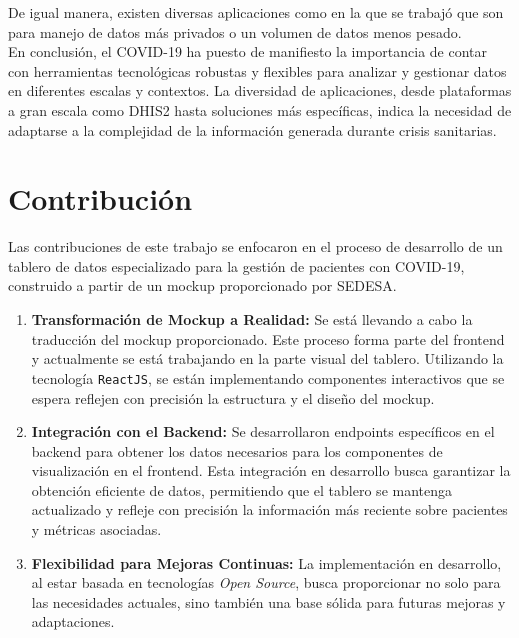 De igual manera, existen diversas aplicaciones como en la que se trabajó que son para manejo de datos más privados o un volumen de datos menos pesado.\\

En conclusión, el \textsc{COVID-19} ha puesto de manifiesto la importancia de contar con herramientas tecnológicas robustas y flexibles para analizar y gestionar datos en diferentes escalas y contextos. La diversidad de aplicaciones, desde plataformas a gran escala como \textsc{DHIS2} hasta soluciones más específicas, indica la necesidad de adaptarse a la complejidad de la información generada durante crisis sanitarias.



\section{Contribución}\label{intro_cont}


Las contribuciones de este trabajo se enfocaron en el proceso de desarrollo de un tablero de datos especializado para la gestión de pacientes con \textsc{COVID-19}, construido a partir de un mockup proporcionado por \textsc{SEDESA}. 

\begin{enumerate}
    \item \textbf{Transformación de Mockup a Realidad:} Se está llevando a cabo la traducción del mockup proporcionado. Este proceso forma parte del frontend y actualmente se está trabajando en la parte visual del tablero. Utilizando la tecnología \texttt{ReactJS}, se están implementando componentes interactivos que se espera reflejen con precisión la estructura y el diseño del mockup.

    
    \item \textbf{Integración con el Backend:} Se desarrollaron endpoints específicos en el backend para obtener los datos necesarios para los componentes de visualización en el frontend. Esta integración en desarrollo busca garantizar la obtención eficiente de datos, permitiendo que el tablero se mantenga actualizado y refleje con precisión la información más reciente sobre pacientes y métricas asociadas.
    
    \item \textbf{Flexibilidad para Mejoras Continuas:} La implementación en desarrollo, al estar basada en tecnologías \textit{Open Source}, busca proporcionar no solo para las necesidades actuales, sino también una base sólida para futuras mejoras y adaptaciones.
\end{enumerate}

